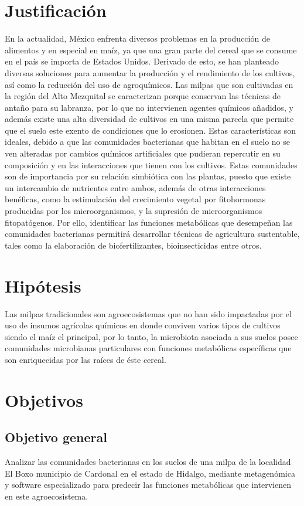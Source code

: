 \documentclass[12pt,letterpaper,oneside]{report}
\begin{document}
\chapter{Justificación}
En la actualidad, México enfrenta diversos problemas en la producción de alimentos y en especial en maíz, ya que una gran parte del cereal que se consume en el país se importa de Estados Unidos. Derivado de esto, se han planteado diversas soluciones para aumentar la producción y el rendimiento de los cultivos, así como la reducción del uso de agroquímicos. Las milpas que son cultivadas en la región del Alto Mezquital se caracterizan porque conservan las técnicas de antaño para su labranza, por lo que no intervienen agentes químicos añadidos, y además existe una alta diversidad de cultivos en una misma parcela que permite que el suelo este exento de condiciones que lo erosionen. Estas características son ideales, debido a que las comunidades bacterianas que habitan en el suelo no se ven alteradas por cambios químicos artificiales que pudieran repercutir en su composición y en las interacciones que tienen con los cultivos. Estas comunidades son de importancia por su relación simbiótica con las plantas, puesto que existe un intercambio de nutrientes entre ambos, además de otras interacciones benéficas, como la estimulación del crecimiento vegetal por fitohormonas producidas por los microorganismos, y la supresión de microorganismos fitopatógenos. Por ello, identificar las funciones metabólicas que desempeñan las comunidades bacterianas permitirá desarrollar técnicas de agricultura sustentable, tales como la elaboración de biofertilizantes, bioinsecticidas entre otros.
\chapter{Hipótesis}
Las milpas tradicionales son agroecosistemas que no han sido impactadas por el uso de insumos agrícolas químicos en donde conviven varios tipos de cultivos siendo el maíz el principal, por lo tanto, la microbiota asociada a sus suelos posee comunidades microbianas particulares con funciones metabólicas específicas que son enriquecidas por las raíces de éste cereal.
\chapter{Objetivos}
\section{Objetivo general}
Analizar las comunidades bacterianas en los suelos de una milpa de la localidad El Boxo municipio de Cardonal en el estado de Hidalgo, mediante metagenómica y software especializado para predecir las funciones metabólicas que intervienen en este agroecosistema.
\end{document}
